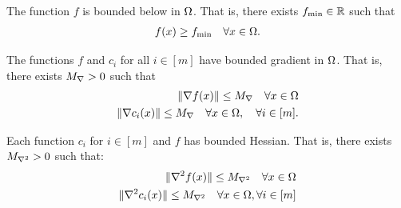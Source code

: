 \begin{assumption}
\label{bounded_below_assumption}
The function $f$ is bounded below in $ \Omega $. That is, there exists $f_{\text{min}} \in \mathbb R$ such that
\begin{align*}
f(x) \ge f_{\text{min}} \quad  \forall x \in \Omega.
\end{align*}
\end{assumption}


\begin{assumption}
\label{bounded_gradients_lemma}
The functions $f$ and $c_i$ for all $ i \in [m]$ have bounded gradient in $ \Omega $.
That is, there exists ${M_{\nabla}} > 0$ such that
\begin{align*}
\|\nabla f(x)\| \le {M_{\nabla}} \quad  \forall x \in \Omega \\
\|\nabla c_i(x)\| \le {M_{\nabla}} \quad  \forall x \in \Omega, \quad \forall i \in [m].
\end{align*}
\end{assumption}

\begin{assumption}
\label{bounded_hessians_assumption}
Each function $c_i$ for $i \in [m]$ and $f$ has bounded Hessian. That is, there exists $ {M_{\nabla^2}} > 0$ such that:
\begin{align*}
\|\nabla^2 f(x) \| \le {M_{\nabla^2}} \quad \forall x \in \Omega \\
\|\nabla^2 c_i(x) \| \le {M_{\nabla^2}} \quad \forall x \in \Omega, \forall i \in [m]
\end{align*}
\end{assumption}


